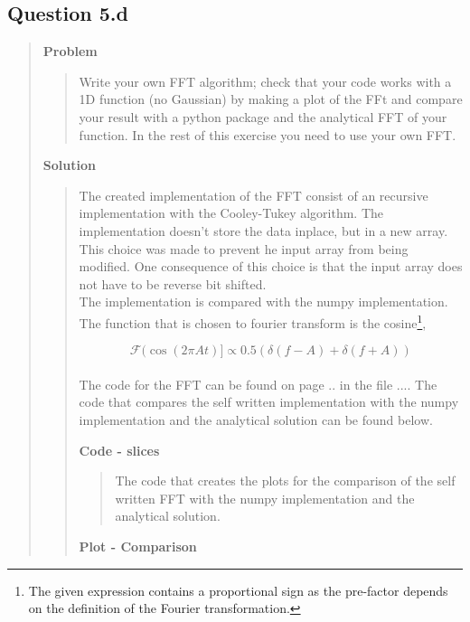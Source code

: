 
\subsection*{\textbf{Question 5.d}}
\begin{quote}

\textbf{Problem}
\begin{quote}
Write your own FFT algorithm; check that your code works with a 1D function (no Gaussian) by making a plot of the FFt and compare your result with a python package and the analytical FFT of your function. In the rest of this exercise you need to use your own FFT. 
\end{quote}

\textbf{Solution} 
\begin{quote}
The created implementation of the FFT consist of an recursive implementation with the Cooley-Tukey algorithm. The implementation doesn't store the data inplace, but in a new array. This choice was made to prevent he input array from being modified. One consequence of this choice is that the input array does not have to be reverse bit shifted. 
\\
The implementation is compared with the numpy implementation. The function that is chosen to fourier transform is the cosine\footnote{The given expression contains a proportional sign as the pre-factor depends on the definition of the Fourier transformation.},

\begin{equation}
\mathcal{F}(\cos(2 \pi At) ]\propto 0.5(\delta(f - A) + \delta(f + A))
\end{equation}
\\
The code for the FFT can be found on page .. in the file .... The code that compares the self written implementation with the numpy implementation and the analytical solution can be found below.  
\newpage

%

\textbf{Code - slices}
\begin{quote}
The code that creates the plots for the comparison of the self written FFT with the numpy implementation and the analytical solution.

\end{quote}

\newpage
\textbf{Plot - Comparison}
\begin{quote}


\end{quote}
\end{quote}
\end{quote}
